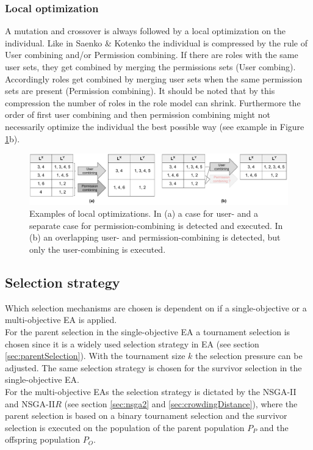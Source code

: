        \subsubsection{Local optimization}
        \label{sec:localOptimization}
        A mutation and crossover is always followed by a local optimization on the individual. Like in Saenko \& Kotenko\cite{saenko2012design} the individual is compressed by the rule of User combining and/or Permission combining. If there are roles with the same user sets, they get combined by merging the permissions sets (User combing). Accordingly roles get combined by merging user sets when the same permission sets are present (Permission combining). It should be noted that by this compression the number of roles in the role model can shrink. Furthermore the order of first user combining and then permission combining might not necessarily optimize the individual the best possible way (see example in Figure \ref{fig:localOptimization}b).
        \begin{figure}
            \centering
            \includegraphics[scale=0.27]{./Figures/LocalOptimization}
            \caption{Examples of local optimizations. In (a) a case for user- and a separate case for permission-combining is detected and executed. In (b) an overlapping user- and permission-combining is detected, but only the user-combining is executed.}
            \label{fig:localOptimization}
        \end{figure}
        
    \subsection{Selection strategy}
    Which selection mechanisms are chosen is dependent on if a single-objective or a multi-objective EA is applied.\\
    For the parent selection in the single-objective EA a tournament selection is chosen since it is a widely used selection strategy in EA (see section \ref{sec:parentSelection}). With the tournament size $k$ the selection pressure can be adjusted. The same selection strategy is chosen for the survivor selection in the single-objective EA.\\
    For the multi-objective EAs the selection strategy is dictated by the NSGA-II and NSGA-II$R$ (see section \ref{sec:nsga2} and \ref{sec:crowdingDistance}), where the parent selection is based on a binary tournament selection and the survivor selection is executed on the population of the parent population $P_P$ and the offspring population $P_O$.
    
